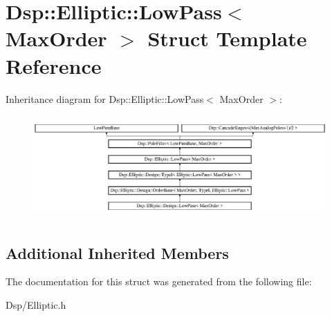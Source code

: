 \hypertarget{structDsp_1_1Elliptic_1_1LowPass}{\section{Dsp\-:\-:Elliptic\-:\-:Low\-Pass$<$ Max\-Order $>$ Struct Template Reference}
\label{structDsp_1_1Elliptic_1_1LowPass}
}
Inheritance diagram for Dsp\-:\-:Elliptic\-:\-:Low\-Pass$<$ Max\-Order $>$\-:\begin{figure}[H]
\begin{center}
\leavevmode
\includegraphics[height=3.981043cm]{structDsp_1_1Elliptic_1_1LowPass}
\end{center}
\end{figure}
\subsection*{Additional Inherited Members}


The documentation for this struct was generated from the following file\-:\begin{DoxyCompactItemize}
\item 
Dsp/Elliptic.\-h\end{DoxyCompactItemize}
